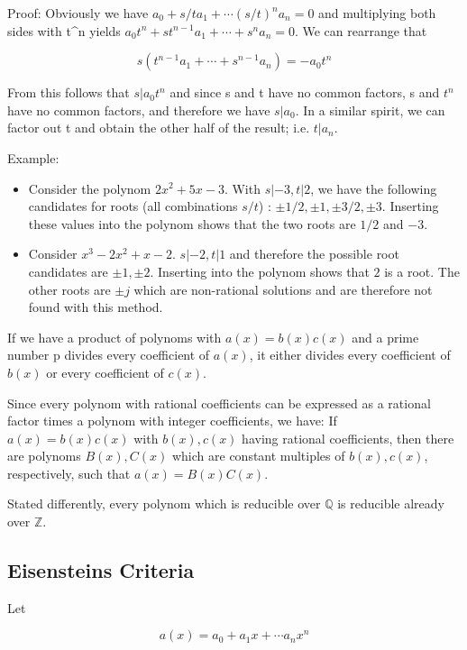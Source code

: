 Proof: Obviously we have \(a_0 + s/t a_1 + \cdots (s/t)^n a_n = 0\) and
multiplying both sides with t\^{}n yields
\(a_0 t^n + s t^{n-1}a_1 + \cdots + s^n a_n =0\). We can rearrange that

\[
s \left( t^{n-1} a_1 + \cdots + s^{n-1} a_n \right) = - a_0 t^n
\]

From this follows that \(s | a_0 t^n\) and since s and t have no common
factors, s and \(t^n\) have no common factors, and therefore we have
\(s|a_0\). In a similar spirit, we can factor out t and obtain the other
half of the result; i.e. \(t|a_n\).

Example:

\begin{itemize}
\item
  Consider the polynom \(2x^2+5x-3\). With \(s|-3, t|2\), we have the
  following candidates for roots (all combinations \(s/t\)) :
  \(\pm 1/2, \pm 1, \pm 3/2, \pm 3\). Inserting these values into the
  polynom shows that the two roots are \(1/2\) and \(-3\).
\item
  Consider \(x^3-2x^2+x-2\). \(s|-2, t|1\) and therefore the possible
  root candidates are \(\pm 1, \pm 2\). Inserting into the polynom shows
  that \(2\) is a root. The other roots are \(\pm j\) which are
  non-rational solutions and are therefore not found with this method.
\end{itemize}

If we have a product of polynoms with \(a(x) = b(x)c(x)\) and a prime
number p divides every coefficient of \(a(x)\), it either divides every
coefficient of \(b(x)\) or every coefficient of \(c(x)\).

Since every polynom with rational coefficients can be expressed as a
rational factor times a polynom with integer coefficients, we have: If
\(a(x) = b(x)c(x)\) with \(b(x), c(x)\) having rational coefficients,
then there are polynoms \(B(x), C(x)\) which are constant multiples of
\(b(x), c(x)\), respectively, such that \(a(x) = B(x) C(x)\).

Stated differently, every polynom which is reducible over \(\mathbb{Q}\)
is reducible already over \(\mathbb{Z}\).

\subsection{Eisensteins Criteria}\label{eisensteins-criteria}

Let

\[
a(x) = a_0 + a_1 x + \cdots a_n x^n
\]

